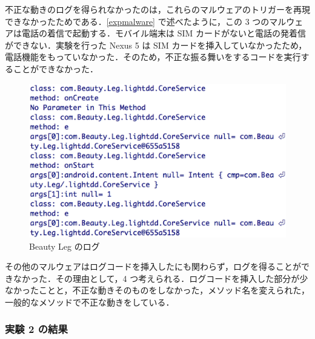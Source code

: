 不正な動きのログを得られなかったのは，これらのマルウェアのトリガーを再現できなかったためである．\ref{expmalware} で述べたように，この 3 つのマルウェアは電話の着信で起動する．モバイル端末は SIM カードがないと電話の発着信ができない．実験を行った Nexus 5 は SIM カードを挿入していなかったため，電話機能をもっていなかった．そのため，不正な振る舞いをするコードを実行することができなかった．


\begin{figure}[t]
\begin{center}
\graphicspath{{./epsfiles/}}
\includegraphics[scale=0.25]{beautyleg2.eps}
\end{center}
\caption{Beauty Leg のログ}
\label{leg}
\end{figure}

その他のマルウェアはログコードを挿入したにも関わらず，ログを得ることができなかった．その理由として，4 つ考えられる．ログコードを挿入した部分が少なかったことと，不正な動きそのものをしなかった，メソッド名を変えられた，一般的なメソッドで不正な動きをしている．

\subsubsection{実験 2 の結果}

